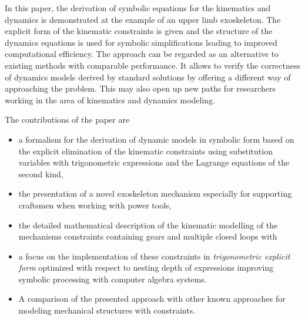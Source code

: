\documentclass[twocolumn,10pt]{IFTOMM}
\begin{document}
In this paper, the derivation of symbolic equations for the kinematics and dynamics is demonstrated at the example of an upper limb exoskeleton.
The explicit form of the kinematic constraints is given and the structure of the dynamics equations is used for symbolic simplifications leading to improved computational efficiency.
The approach can be regarded as an alternative to existing methods with comparable performance.
It allows to verify the correctness of dynamics models derived by standard solutions by offering a different way of approaching the problem.
This may also open up new paths for researchers working in the area of kinematics and dynamics modeling.

%
%
%
%
%

The contributions of the paper are
\begin{itemize}
    \item a formalism for the derivation of dynamic models in symbolic form based on the explicit elimination of the kinematic constraints using substitution variables with trigonometric expressions and the Lagrange equations of the second kind,
    \item the presentation of a novel exoskeleton mechanism especially for supporting craftsmen when working with power tools,
    \item the detailed mathematical description of the kinematic modelling of the mechanisms constraints containing gears and multiple closed loops with
    \item a focus on the implementation of these constraints in \emph{trigonometric explicit form} optimized with respect to nesting depth of expressions improving symbolic processing with computer algebra systems.
    \item A comparison of the presented approach with other known approaches for modeling mechanical structures with constraints.
\end{itemize}
\end{document}
